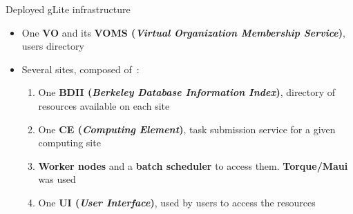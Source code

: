 \documentclass[11pt,final,usepdftitle=false,handout]{beamer}
\begin{document}
	\begin{frame}{Deployed gLite infrastructure}
\begin{itemize}

	\item One \textbf{VO} and its \textbf{VOMS (\textsl{Virtual Organization Membership Service})},
	users directory
					\medskip

\item Several sites, composed of~:

		\medskip
\begin{enumerate}

	\item One \textbf{BDII (\textsl{Berkeley Database Information Index})}, directory of resources available on each site

		\medskip

	\item One \textbf{CE (\textsl{Computing Element})}, task submission service for a given computing site
\medskip
	\item \textbf{Worker nodes} and a \textbf{batch scheduler}
		to access them. \textbf{Torque/Maui} was used

		\medskip

	\item One \textbf{UI (\textsl{User Interface})}, used by users to access the resources

\end{enumerate}
\end{itemize}
	\end{frame}
\end{document}
